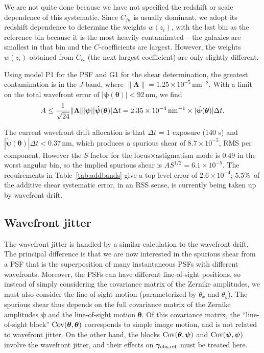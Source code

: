 \documentclass[aps,prd, amsmath,amssymb,superscriptaddress,showkeys,nofootinbib,reprint,preprintnumbers]{revtex4-1}
\begin{document}
\begin{widetext}
We are not quite done because we have not specified the redshift or
scale dependence of this systematic. Since $C_{fa}$ is usually
dominant, we adopt its redshift dependence to determine the weights
$w(z_i)$, with the last bin as the reference bin because it is the
most heavily contaminated -- the galaxies are smallest in that bin and
the $C$-coefficients are largest. However, the weights $w(z_i)$
obtained from $C_{ct}$ (the next largest coefficient) are only
slightly different.

Using model P1 for the PSF and G1 for the shear determination, the
greatest contamination is in the $J$-band, where
$\lVert{\boldsymbol\Lambda}\rVert = 1.25\times
10^{-5}\,$nm$^{-2}$. With a limit on the total wavefront error of
$|{\boldsymbol\psi}({\boldsymbol\theta})|<92\,$nm, we find
\begin{equation}
A \le \frac1{\sqrt{24}}\lVert{\boldsymbol\Lambda} \rVert |{\boldsymbol\psi}| |\dot{\boldsymbol\psi}({\boldsymbol\theta})| \Delta t
= 2.35\times 10^{-4}\, {\rm nm}^{-1}\times |\dot{\boldsymbol\psi}({\boldsymbol\theta})| \Delta t.
\end{equation}

The current wavefront drift allocation is that $\Delta t$ = 1 exposure
(140 s) and $|\dot{\boldsymbol\psi}({\boldsymbol\theta})| \Delta
t<0.37\,$nm, which produces a spurious shear of $8.7\times 10^{-5}$,
RMS per component. However the $S$-factor for the
focus$\times$astigmatism mode is 0.49 in the worst angular bin, so the
implied spurious shear is $AS^{1/2} = 6.1\times 10^{-5}$. The
requirements in Table~\ref{tab:addbands} give a top-level error of
$2.6\times 10^{-4}$; 5.5\%\ of the additive shear systematic error, in
an RSS sense, is currently being taken up by wavefront drift.

\subsection{Wavefront jitter}
\label{as:a-wfjitter}

The wavefront jitter is handled by a similar calculation to the
wavefront drift. The principal difference is that we are now
interested in the spurious shear from a PSF that is the superposition
of many instantaneous PSFs with different wavefronts. Moreover, the
PSFs can have different line-of-sight positions, so instead of simply
considering the covariance matrix of the Zernike amplitudes, we must
also consider the line-of-sight motion (parameterized by $\theta_x$
and $\theta_y$). The spurious shear thus depends on the full
covariance matrix of the Zernike amplitudes ${\boldsymbol\psi}$ and
the line-of-sight motion ${\boldsymbol\theta}$. Of this covariance
matrix, the ``line-of-sight block'' ${\rm
Cov}({\boldsymbol\theta},{\boldsymbol\theta})$ corresponds to simple
image motion, and is not related to wavefront jitter. On the other
hand, the blocks ${\rm Cov}({\boldsymbol\theta},{\boldsymbol\psi})$
and ${\rm Cov}({\boldsymbol\psi},{\boldsymbol\psi})$ involve the
wavefront jitter, and their effects on ${\boldsymbol\gamma}_{\rm
obs,ref}$ must be treated here.


\end{widetext}
\end{document}
